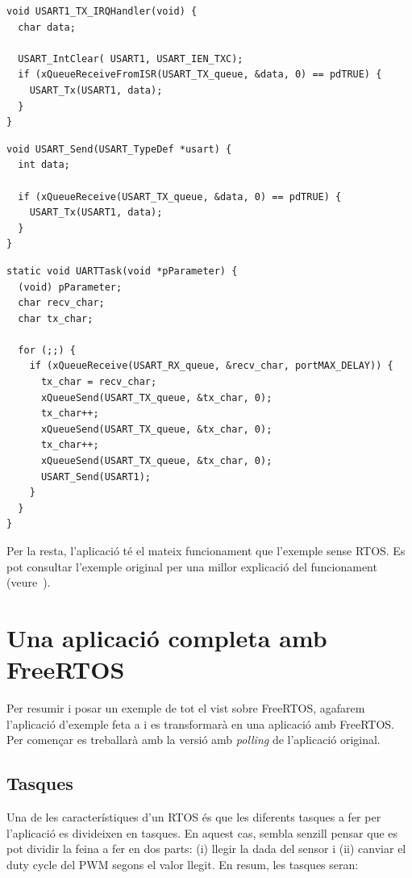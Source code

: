 \begin{lstlisting}[style=customc,caption={ISR de TX de la UART amb FreeRTOS}]
void USART1_TX_IRQHandler(void) {
  char data;

  USART_IntClear( USART1, USART_IEN_TXC);
  if (xQueueReceiveFromISR(USART_TX_queue, &data, 0) == pdTRUE) {
    USART_Tx(USART1, data);
  }
}
\end{lstlisting}

\begin{lstlisting}[style=customc,caption={funció UART\_Send() per FreeRTOS}]
void USART_Send(USART_TypeDef *usart) {
  int data;

  if (xQueueReceive(USART_TX_queue, &data, 0) == pdTRUE) {
    USART_Tx(USART1, data);
  }
}
\end{lstlisting}

\begin{lstlisting}[style=customc,caption=Tasca principal de l'exemple]
static void UARTTask(void *pParameter) {
  (void) pParameter;
  char recv_char;
  char tx_char;

  for (;;) {
    if (xQueueReceive(USART_RX_queue, &recv_char, portMAX_DELAY)) {
      tx_char = recv_char;
      xQueueSend(USART_TX_queue, &tx_char, 0);
      tx_char++;
      xQueueSend(USART_TX_queue, &tx_char, 0);
      tx_char++;
      xQueueSend(USART_TX_queue, &tx_char, 0);
      USART_Send(USART1);
    }
  }
}
\end{lstlisting}


Per la resta, l'aplicació té el mateix funcionament que l'exemple sense RTOS. Es pot consultar l'exemple original per una millor explicació del funcionament (veure~).


\chapter{Una aplicació completa amb FreeRTOS}

Per resumir i posar un exemple de tot el vist sobre \gls{FreeRTOS}, agafarem l'aplicació d'exemple feta a  i es transformarà en una aplicació amb FreeRTOS. Per començar es treballarà amb la versió amb {\em polling} de l'aplicació original.

\section{Tasques}
Una de les característiques d'un \gls{RTOS} és que les diferents tasques a fer per l'aplicació es divideixen en tasques. En aquest cas, sembla senzill pensar que es pot dividir la feina a fer en dos parts: (i) llegir la dada del sensor i (ii) canviar el \gls{duty cycle} del \gls{PWM} segons el valor llegit. En resum, les tasques seran:

